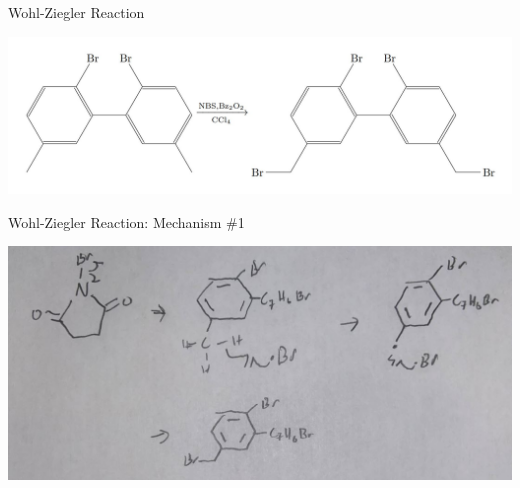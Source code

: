 \documentclass[notes]{beamer}
\begin{document}
\begin{frame}{Wohl-Ziegler Reaction}

\begin{center}
    \includegraphics[scale=.2]{wohl_ziegler_overall.JPG}
\end{center}
    

\end{frame}

\begin{frame}{Wohl-Ziegler Reaction: Mechanism \#1}

\begin{center}
    \includegraphics[scale=.35]{wohl_ziegler_one.JPG}
\end{center}
    
\note{\begin{itemize}
    \item 
\end{itemize}}

\end{frame}
\end{document}
